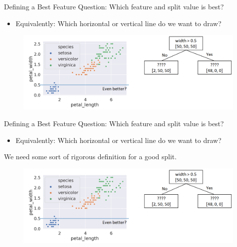\documentclass[aspectratio=169]{../latex_main/tntbeamer}  %
\begin{document}
	\begin{frame}{Defining a Best Feature}
	    Question: Which feature and split value is best?
	    \begin{itemize}
	        \item  Equivalently: Which horizontal or vertical line do we want to draw?
	    \end{itemize}
	    \begin{figure}
	        \centering
	        \includegraphics[scale=.4]{Bild45}
	    \end{figure}
	\end{frame}
	
	
	\begin{frame}{Defining a Best Feature}
	    Question: Which feature and split value is best?
	    \begin{itemize}
	        \item  Equivalently: Which horizontal or vertical line do we want to draw?
	    \end{itemize}
	    \alert{We need some sort of rigorous definition for a good split.}
	    \begin{figure}
	        \centering
	        \includegraphics[scale=.4]{Bild45}
	    \end{figure}
	\end{frame}
	
\end{document}

